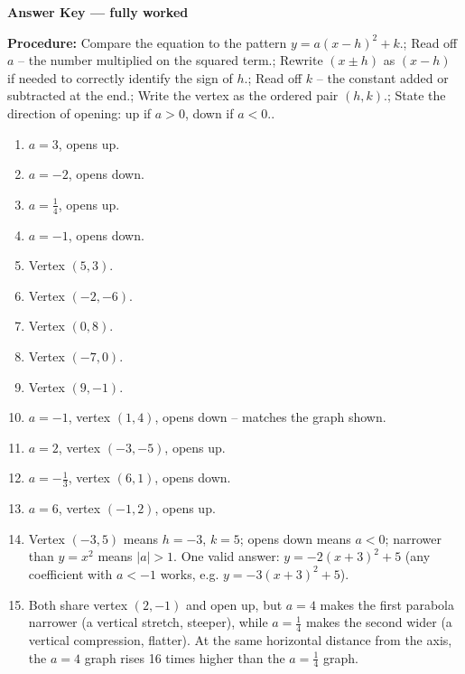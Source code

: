 \documentclass[12pt]{article}
\begin{document}
\begin{center}{\Large \textbf{Answer Key --- fully worked}}\end{center}
\vspace{0.25cm}
\textbf{Procedure:} Compare the equation to the pattern $y=a(x-h)^2+k$.; Read off $a$ -- the number multiplied on the squared term.; Rewrite $(x\pm h)$ as $(x-h)$ if needed to correctly identify the sign of $h$.; Read off $k$ -- the constant added or subtracted at the end.; Write the vertex as the ordered pair $(h,k)$.; State the direction of opening: up if $a>0$, down if $a<0$..\\[8pt]
\begin{enumerate}[label=\textbf{\arabic*.},itemsep=7pt]
  \item $a=3$, opens up.
  \item $a=-2$, opens down.
  \item $a=\frac{1}{4}$, opens up.
  \item $a=-1$, opens down.
  \item Vertex $(5,3)$.
  \item Vertex $(-2,-6)$.
  \item Vertex $(0,8)$.
  \item Vertex $(-7,0)$.
  \item Vertex $(9,-1)$.
  \item $a=-1$, vertex $(1,4)$, opens down -- matches the graph shown.
  \item $a=2$, vertex $(-3,-5)$, opens up.
  \item $a=-\frac{1}{3}$, vertex $(6,1)$, opens down.
  \item $a=6$, vertex $(-1,2)$, opens up.
  \item Vertex $(-3,5)$ means $h=-3$, $k=5$; opens down means $a<0$; narrower than $y=x^2$ means $|a|>1$. One valid answer: $y=-2(x+3)^2+5$ (any coefficient with $a<-1$ works, e.g. $y=-3(x+3)^2+5$).
  \item Both share vertex $(2,-1)$ and open up, but $a=4$ makes the first parabola narrower (a vertical stretch, steeper), while $a=\frac{1}{4}$ makes the second wider (a vertical compression, flatter). At the same horizontal distance from the axis, the $a=4$ graph rises 16 times higher than the $a=\frac{1}{4}$ graph.
\end{enumerate}
\end{document}
